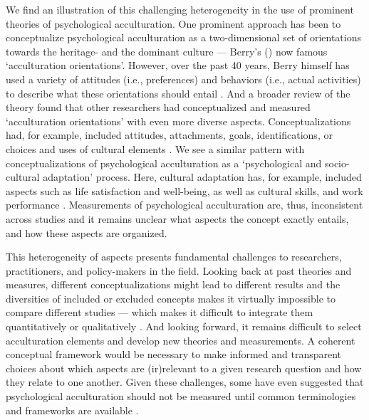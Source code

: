 \documentclass[man, 12pt, a4paper, mask]{apa7}
\begin{document}
We find an illustration of this challenging heterogeneity in the use of prominent theories of psychological acculturation. One prominent approach has been to conceptualize psychological acculturation as a two-dimensional set of orientations towards the heritage- and the dominant culture --- Berry's (\citeyear{Berry1980, Berry1997b, Berry2005}) now famous `acculturation orientations'. However, over the past 40 years, Berry himself has used a variety of attitudes (i.e., preferences) and behaviors (i.e., actual activities) to describe what these orientations should entail \citep{Berry2005}. And a broader review of the theory found that other researchers had conceptualized and measured `acculturation orientations' with even more diverse aspects. Conceptualizations had, for example, included attitudes, attachments, goals, identifications, or choices and uses of cultural elements \citep[e.g., language, food, or dresses. See,][]{Rudmin2003a}. We see a similar pattern with conceptualizations of psychological acculturation as a `psychological and socio-cultural adaptation' process. Here, cultural adaptation has, for example, included aspects such as life satisfaction and well-being, as well as cultural skills, and work performance \citep{Searle1990, Ward2001, Berry2003}.
Measurements of psychological acculturation are, thus, inconsistent across studies and it remains unclear what aspects the concept exactly entails, and how these aspects are organized.

This heterogeneity of aspects presents fundamental challenges to researchers, practitioners, and policy-makers in the field. Looking back at past theories and measures, different conceptualizations might lead to different results \citep{Snauwaert2003} and the diversities of included or excluded concepts makes it virtually impossible to compare different studies --- which makes it difficult to integrate them quantitatively or qualitatively \citep{Taft1981}.
And looking forward, it remains difficult to select acculturation elements and develop new theories and measurements. A coherent conceptual framework would be necessary to make informed and transparent choices about which aspects are (ir)relevant to a given research question and how they relate to one another.
Given these challenges, some have even suggested that psychological acculturation should not be measured until common terminologies and frameworks are available \citep{Escobar2000}.
\end{document}
